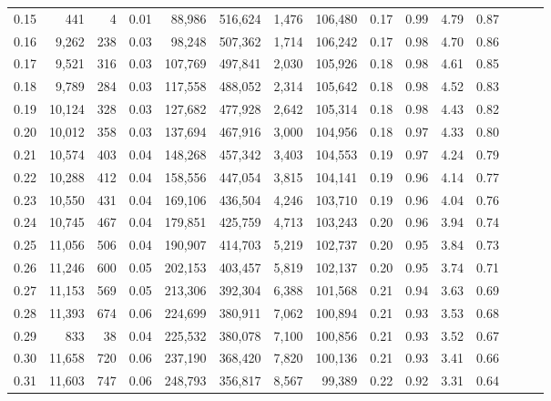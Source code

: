 \begin{tabular}{rrrrrrrrrrrrrrr}
0.15 &     441 &      4 &  0.01 &   88,986 &  516,624 &    1,476 &  106,480 &  0.17 &  0.99 &  4.79 &      0.87 \\
0.16 &   9,262 &    238 &  0.03 &   98,248 &  507,362 &    1,714 &  106,242 &  0.17 &  0.98 &  4.70 &      0.86 \\
0.17 &   9,521 &    316 &  0.03 &  107,769 &  497,841 &    2,030 &  105,926 &  0.18 &  0.98 &  4.61 &      0.85 \\
0.18 &   9,789 &    284 &  0.03 &  117,558 &  488,052 &    2,314 &  105,642 &  0.18 &  0.98 &  4.52 &      0.83 \\
0.19 &  10,124 &    328 &  0.03 &  127,682 &  477,928 &    2,642 &  105,314 &  0.18 &  0.98 &  4.43 &      0.82 \\
0.20 &  10,012 &    358 &  0.03 &  137,694 &  467,916 &    3,000 &  104,956 &  0.18 &  0.97 &  4.33 &      0.80 \\
0.21 &  10,574 &    403 &  0.04 &  148,268 &  457,342 &    3,403 &  104,553 &  0.19 &  0.97 &  4.24 &      0.79 \\
0.22 &  10,288 &    412 &  0.04 &  158,556 &  447,054 &    3,815 &  104,141 &  0.19 &  0.96 &  4.14 &      0.77 \\
0.23 &  10,550 &    431 &  0.04 &  169,106 &  436,504 &    4,246 &  103,710 &  0.19 &  0.96 &  4.04 &      0.76 \\
0.24 &  10,745 &    467 &  0.04 &  179,851 &  425,759 &    4,713 &  103,243 &  0.20 &  0.96 &  3.94 &      0.74 \\
0.25 &  11,056 &    506 &  0.04 &  190,907 &  414,703 &    5,219 &  102,737 &  0.20 &  0.95 &  3.84 &      0.73 \\
0.26 &  11,246 &    600 &  0.05 &  202,153 &  403,457 &    5,819 &  102,137 &  0.20 &  0.95 &  3.74 &      0.71 \\
0.27 &  11,153 &    569 &  0.05 &  213,306 &  392,304 &    6,388 &  101,568 &  0.21 &  0.94 &  3.63 &      0.69 \\
0.28 &  11,393 &    674 &  0.06 &  224,699 &  380,911 &    7,062 &  100,894 &  0.21 &  0.93 &  3.53 &      0.68 \\
0.29 &     833 &     38 &  0.04 &  225,532 &  380,078 &    7,100 &  100,856 &  0.21 &  0.93 &  3.52 &      0.67 \\
0.30 &  11,658 &    720 &  0.06 &  237,190 &  368,420 &    7,820 &  100,136 &  0.21 &  0.93 &  3.41 &      0.66 \\
0.31 &  11,603 &    747 &  0.06 &  248,793 &  356,817 &    8,567 &   99,389 &  0.22 &  0.92 &  3.31 &      0.64 \\

\end{tabular}
